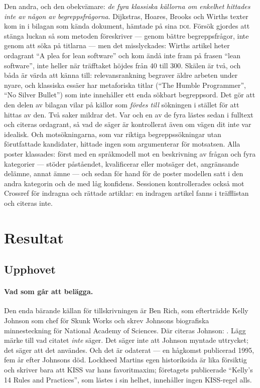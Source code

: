 Den andra, och den obekvämare: \emph{de fyra klassiska källorna om enkelhet
hittades inte av någon av begreppsfrågorna}.  Dijkstras, Hoares, Brooks och
Wirths texter kom in i bilagan som kända dokument, hämtade på sina
\textsc{doi}.  Försök gjordes att stänga luckan så som metoden föreskriver
--- genom bättre begreppsfrågor, inte genom att söka på titlarna --- men det
misslyckades: Wirths artikel heter ordagrant \enquote{A plea for lean
software} och kom ändå inte fram på frasen \enquote{lean software}, inte
heller när träfftaket höjdes från 40 till 300.  Skälen är två, och båda är
värda att känna till: relevansrankning begraver äldre arbeten under nyare,
och klassiska essäer har metaforiska titlar (\enquote{The Humble
Programmer}, \enquote{No Silver Bullet}) som inte innehåller ett enda
sökbart begreppsord.  Det gör att den delen av bilagan vilar på källor som
\emph{fördes till} sökningen i stället för att hittas av den.  Två saker
mildrar det.  Var och en av de fyra lästes sedan i fulltext och citeras
ordagrant, så vad de säger är kontrollerat även om vägen dit inte var
idealisk.  Och motsökningarna, som var riktiga begreppssökningar utan
förutfattade kandidater, hittade ingen som argumenterar för motsatsen.
Alla poster klassades: först med en språkmodell mot en beskrivning av frågan
och fyra kategorier --- stöder påståendet, kvalificerar eller motsäger det,
angränsande delämne, annat ämne --- och sedan för hand för de poster
modellen satt i den andra kategorin och de med låg konfidens.  Sessionen
kontrollerades också mot Crossref för indragna och rättade artiklar: en
indragen artikel fanns i träfflistan och citeras inte.

\section{Resultat}
\label{sec:kiss-resultat}

\subsection*{Upphovet}

\paragraph{Vad som går att belägga.}  Den enda bärande källan för
tillskrivningen är Ben Rich, som efterträdde Kelly Johnson som chef för
Skunk Works och skrev Johnsons biografiska minnesteckning för
\foreignlanguage{english}{National Academy of Sciences}.  Där citeras
Johnson: .  Lägg märke till vad citatet
\emph{inte} säger.  Det säger inte att Johnson myntade uttrycket; det säger
att det användes.  Och det är odaterat --- en hågkomst publicerad 1995, fem
år efter Johnsons död.  Lockheed Martins egen historiksida är lika försiktig
och skriver bara att KISS var hans favoritmaxim; företagets publicerade
\enquote{Kelly's 14 Rules and Practices}, som lästes i sin
helhet, innehåller ingen KISS-regel alls\autocite{LockheedMartinJohnson}.

